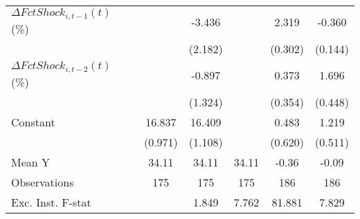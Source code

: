 {\begin{tabular}{l*{5}{c}}
\addlinespace
$ \Delta FctShock_{i,t-1}(t)$ (\%)&                     &      -3.436         &                     &       2.319\sym{***}&      -0.360\sym{**} \\
                    &                     &     (2.182)         &                     &     (0.302)         &     (0.144)         \\
\addlinespace
$ \Delta FctShock_{i,t-2}(t)$ (\%)&                     &      -0.897         &                     &       0.373         &       1.696\sym{***}\\
                    &                     &     (1.324)         &                     &     (0.354)         &     (0.448)         \\
\addlinespace
Constant            &      16.837\sym{***}&      16.409\sym{***}&                     &       0.483         &       1.219\sym{**} \\
                    &     (0.971)         &     (1.108)         &                     &     (0.620)         &     (0.511)         \\
\midrule
Mean Y              &       34.11         &       34.11         &       34.11         &       -0.36         &       -0.09         \\
Observations        &         175         &         175         &         175         &         186         &         186         \\
Exc. Inst. F-stat   &                     &       1.849         &       7.762         &      81.881         &       7.829         \\
\bottomrule
\end{tabular}
}
